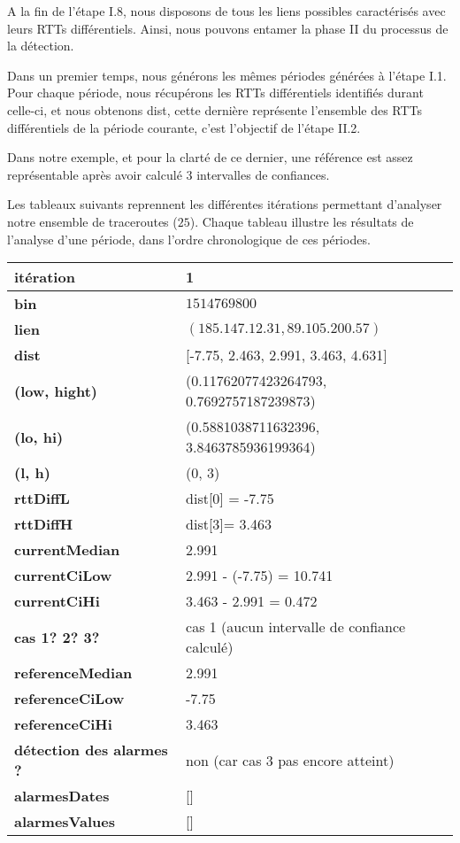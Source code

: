 A la fin de l'étape I.8, nous disposons de tous les liens possibles caractérisés avec leurs RTTs différentiels. Ainsi, nous pouvons entamer la phase II du processus de la détection.

Dans un premier temps, nous générons les mêmes  périodes générées à  l'étape I.1. Pour chaque période,  nous récupérons les RTTs différentiels identifiés durant celle-ci, et nous obtenons {\color{gray} dist}, cette dernière représente l'ensemble des RTTs différentiels de la période courante, c'est l'objectif de l'étape II.2.

Dans notre exemple,  et pour la clarté de ce dernier, une référence est assez représentable après avoir calculé 3 intervalles de confiances.  

Les tableaux suivants reprennent les différentes itérations permettant d'analyser notre ensemble de traceroutes ($25$). Chaque tableau illustre les résultats de l'analyse d'une période, dans l'ordre chronologique de ces périodes.
\newpage
	\begin{table}[H]
		\centering

		\begin{tabularx}{\linewidth}{|l|X| }
		\hline
\textbf{itération} & 1	\\ \hline
\textbf{bin} & $1514769800$ \\ \hline
\textbf{lien} & $(185.147.12.31, 89.105.200.57)$  \\ \hline
\textbf{dist}& [-7.75, 2.463, 2.991, 3.463, 4.631]	\\ \hline
\textbf{(low, hight)}& (0.11762077423264793, 0.7692757187239873) 	\\ \hline
\textbf{(lo, hi)}&(0.5881038711632396, 3.8463785936199364)  \\ \hline
\textbf{(l, h)} & (0, 3) 	\\ \hline
\textbf{rttDiffL}& dist[0] = -7.75	\\ \hline
\textbf{rttDiffH}& dist[3]= 3.463	\\ \hline
\textbf{currentMedian}& 2.991	\\ \hline
\textbf{currentCiLow}&  2.991 - (-7.75) = 10.741 	\\ \hline
\textbf{currentCiHi}& 3.463 - 2.991 =  0.472	\\ \hline
\textbf{cas 1? 2? 3?}& cas 1 (aucun intervalle de confiance calculé)  \\ \hline
\textbf{referenceMedian}& 2.991	\\ \hline
\textbf{referenceCiLow}& -7.75	\\ \hline
\textbf{referenceCiHi}&3.463	\\ \hline
\textbf{détection des alarmes ?}& non (car cas 3 pas  encore atteint)	\\ \hline
\textbf{alarmesDates}& []	\\ \hline
\textbf{alarmesValues}& []	\\ \hline
		
			
		\end{tabularx}
	\end{table}


